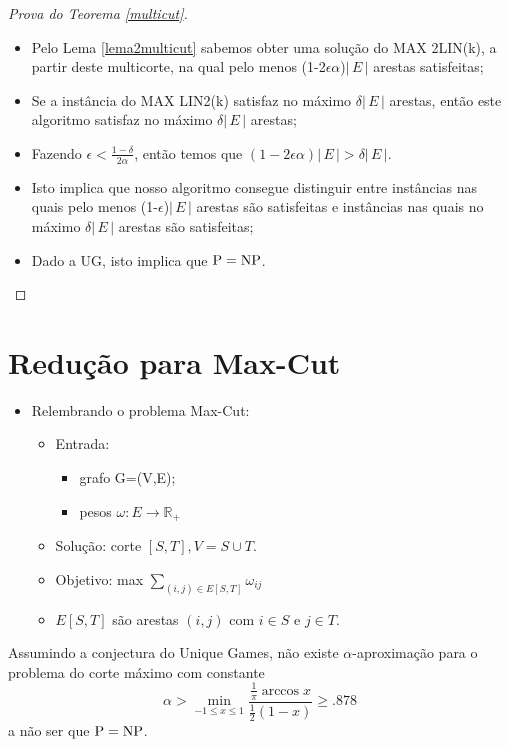 \documentclass[12pt,a4paper]{article}
\begin{document}
\begin{itemize}
\begin{proof}[Prova do Teorema \ref{multicut}]
\begin{itemize}
        \item Pelo Lema \ref{lema2multicut} sabemos obter uma solução do MAX 2LIN(k), a partir deste multicorte, na qual pelo menos (1-2$\epsilon \alpha$)$|\,E\,|$ arestas satisfeitas;
        \item Se a instância do MAX LIN2(k) satisfaz no máximo $\delta|\,E\,|$ arestas, então este algoritmo satisfaz no máximo $\delta|\,E\,|$ arestas;
        \item Fazendo $\epsilon < \frac{1-\delta}{2\alpha}$, então temos que $(1-2\epsilon\alpha)|\,E\,| > \delta|\,E\,|$.
        \item Isto implica que nosso algoritmo consegue distinguir entre instâncias nas quais pelo menos (1-$\epsilon$)$|\,E\,|$ arestas são satisfeitas e instâncias nas quais no máximo $\delta|\,E\,|$ arestas são satisfeitas;
        \item Dado a UG, isto implica que $\mathrm{P} = \mathrm{NP}$.
    \end{itemize}
    \end{proof}
\end{itemize}

\section{Redução para Max-Cut}
\begin{itemize}
    \item Relembrando o problema Max-Cut:
    \begin{itemize}
        \item Entrada:
            \begin{itemize}
                \item grafo G=(V,E);
                \item pesos $\omega: E \xrightarrow{} \mathbb{R_+}$
            \end{itemize}
        \item Solução: corte $[S,T], V=S \cup T$.
        \item Objetivo: max $\sum_{(i,j) \in E[S,T]}\omega_{ij}$
        \item $E[S,T]$ são arestas $(i,j)$ com $i \in S$ e $j \in T$.
    \end{itemize}
\end{itemize}    

\begin{teorema} \label{maxcut}
    Assumindo a conjectura do Unique Games, não existe $\alpha$-aproximação para o problema do corte máximo com constante
    \[\alpha > \min_{-1 \le x \le 1} \frac{\frac{1}{\pi} \arccos{x}}{\frac{1}{2}(1-x)} \ge .878 \]
    a não ser que $\mathrm{P} = \mathrm{NP}$.
\end{teorema}
\end{document}
